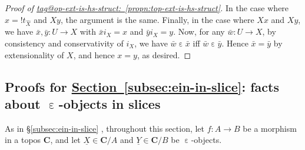 \documentclass{amsart}
\makeatletter
\newcommand\alttext{\texorpdfstring}
\newcommand\bC{\mathbf{C}}
\newcommand\ein{\mathrel{\varepsilon}}
\newcommand\und[1]{\underline{#1}}
\newcommand\unein{{\ein}}
\newcommand\unex{{!}}
\newcommand\wh[1]{\widehat{#1}}
\newcommand\tagword[1]{\csname tag@#1\endcsname}
\def\label@tag#1:#2\@nil{#1}
\newcommand\labeltag[1]{\label@tag#1:\@nil}
\newcommand\jref[1]{%
  \texorpdfstring%
    {\hyperref[#1]{\tagword{\labeltag{#1}}~\ref*{#1}}}%
    {\tagword{\labeltag{#1}}~\ref*{#1}}%
}
\newcommand\prerefpost[3]{%
  \texorpdfstring%
    {\hyperref[#2]{#1\ref*{#2}#3}}%
    {#1\ref*{#2}#3}%
}
\newcommand\sref[1]{\prerefpost{\S}{#1}{}}
\theoremstyle{definition}
\theoremstyle{remark}
\theoremstyle{plainwithref}
\makeatother
\begin{document}
\begin{proof}[Proof of \jref{propn:top-ext-is-hs-struct}]
  In the case where \( x = \unex t_{\wh X} \) and \( X y \), the argument is the same.
  Finally, in the case where \( X x \) and \( X y \), we have \( \bar x, \bar y \colon U \to X \) with \( \bar x i_X = x \) and \( \bar y i_X = y \).
  Now, for any \( \bar w \colon U \to X \), by consistency and conservativity of \( i_X \), we have \( \bar w \ein \bar x \) iff \( \bar w \ein \bar y \).
  Hence \( \bar x = \bar y \) by extensionality of \( X \), and hence \( x = y \), as desired.
\end{proof}

\subsection{Proofs for \alttext{\hyperref[subsec:ein-in-slice]{Section~\ref*{subsec:ein-in-slice}}}{Section~\ref*{subsec:ein-in-slice}}: facts about \alttext{\( \unein \)}{ε}-objects in slices} \label{subsec:ein-in-slice-proofs}
As in \sref{subsec:ein-in-slice}, throughout this section, let \( f \colon A \to B \) be a morphism in a topos \( \bC \), and let \( \und X \in \bC / A \) and \( \und Y \in \bC / B \) be \( \ein \)-objects.
\end{document}
